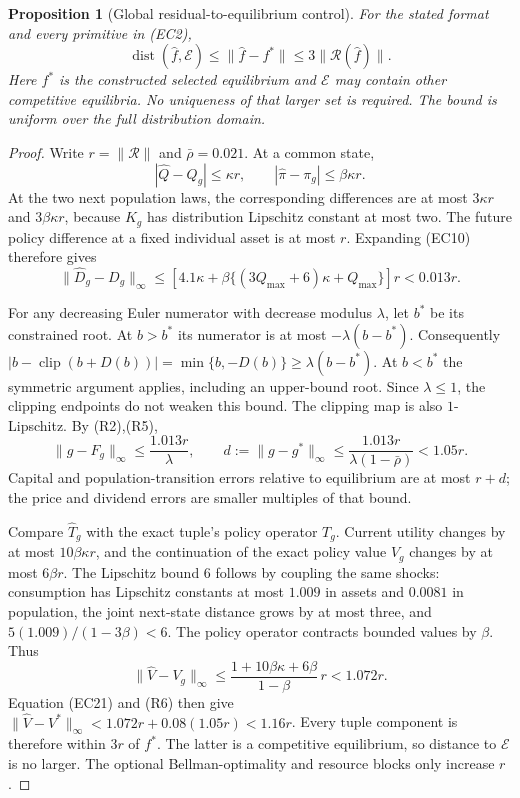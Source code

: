 \documentclass[11pt,a4paper]{article}
\newtheorem{proposition}[theorem]{Proposition}
\begin{document}
\begin{proposition}[Global residual-to-equilibrium control]
\label{prop:full-residual-stability}
For the stated format and every primitive in \textup{(EC2)},
\[
 \operatorname{dist}(\widehat f,\mathcal E)
 \leq\|\widehat f-f^*\|\leq3\|\mathcal R(\widehat f)\|.
 \tag{R4}
\]
Here $f^*$ is the constructed selected equilibrium and $\mathcal E$
may contain other competitive equilibria. No uniqueness of that larger
set is required. The bound is uniform over the full distribution domain.
\end{proposition}
\begin{proof}
Write $r=\|\mathcal R\|$ and $\bar\rho=0.021$. At a common state,
\[
 |\widehat Q-Q_g|\leq\kappa r,\qquad
 |\widehat\pi-\pi_g|\leq\beta\kappa r.
\]
At the two next population laws, the corresponding differences are
at most $3\kappa r$ and $3\beta\kappa r$, because
$K_g$ has distribution Lipschitz constant at most two. The future
policy difference at a fixed individual asset is at most $r$.
Expanding \textup{(EC10)} therefore gives
\[
 \|\widehat D_g-D_g\|_\infty
 \leq\left[4.1\kappa+
 \beta\{(3Q_{\max}+6)\kappa+Q_{\max}\}\right]r<0.013r.
 \tag{R5}
\]

For any decreasing Euler numerator with decrease modulus $\lambda$,
let $b^*$ be its constrained root. At $b>b^*$ its numerator is at
most $-\lambda(b-b^*)$. Consequently
$|b-\operatorname{clip}(b+D(b))|
 =\min\{b,-D(b)\}\geq\lambda(b-b^*)$.
At $b<b^*$ the symmetric argument applies, including an upper-bound
root. Since $\lambda\leq1$, the clipping endpoints do not weaken this
bound. The clipping map is also $1$-Lipschitz. By \textup{(R2),(R5)},
\[
 \|g-F_g\|_\infty\leq\frac{1.013r}{\lambda},\qquad
 d:=\|g-g^*\|_\infty
 \leq\frac{1.013r}{\lambda(1-\bar\rho)}<1.05r.
 \tag{R6}
\]
Capital and population-transition errors relative to equilibrium are
at most $r+d$; the price and dividend errors are smaller multiples of
that bound.

Compare $\widehat T_g$ with the exact tuple's policy operator $T_g$.
Current utility changes by at most $10\beta\kappa r$, and the
continuation of the exact policy value $V_g$ changes by at most
$6\beta r$. The Lipschitz bound $6$ follows by coupling the same
shocks: consumption has Lipschitz constants at most $1.009$ in assets
and $0.0081$ in population, the joint next-state distance grows by at
most three, and $5(1.009)/(1-3\beta)<6$.
The policy operator contracts bounded values by $\beta$. Thus
\[
 \|\widehat V-V_g\|_\infty
 \leq\frac{1+10\beta\kappa+6\beta}{1-\beta}\,r<1.072r.
\]
Equation \textup{(EC21)} and \textup{(R6)} then give
$\|\widehat V-V^*\|_\infty<1.072r+0.08(1.05r)<1.16r$.
Every tuple component is therefore within $3r$ of $f^*$. The latter
is a competitive equilibrium, so distance to $\mathcal E$ is no larger.
The optional Bellman-optimality and resource blocks only increase $r$.
\end{proof}
\end{document}
